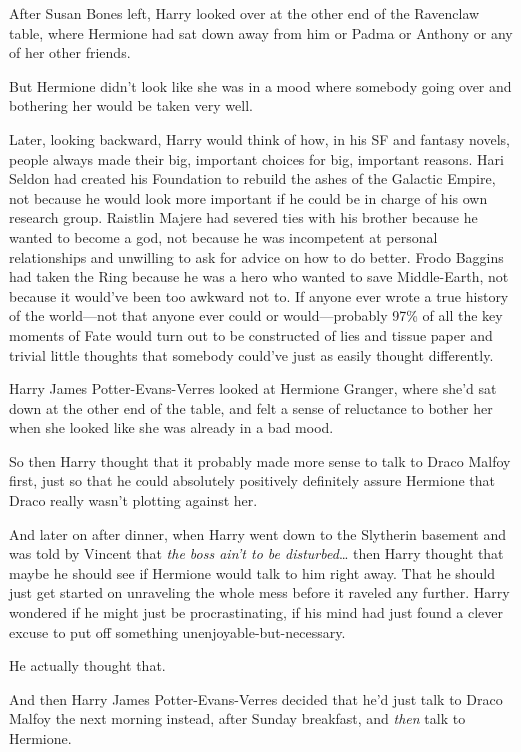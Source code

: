 After Susan Bones left, Harry looked over at the other end of the Ravenclaw
table, where Hermione had sat down away from him or Padma or Anthony or any of
her other friends.

But Hermione didn't look like she was in a mood where somebody going over and
bothering her would be taken very well.

Later, looking backward, Harry would think of how, in his SF and fantasy
novels, people always made their big, important choices for big, important
reasons. Hari Seldon had created his Foundation to rebuild the ashes of the
Galactic Empire, not because he would look more important if he could be in
charge of his own research group. Raistlin Majere had severed ties with his
brother because he wanted to become a god, not because he was incompetent at
personal relationships and unwilling to ask for advice on how to do better.
Frodo Baggins had taken the Ring because he was a hero who wanted to save
Middle-Earth, not because it would've been too awkward not to. If anyone ever
wrote a true history of the world---not that anyone ever could or
would---probably 97\% of all the key moments of Fate would turn out to be
constructed of lies and tissue paper and trivial little thoughts that somebody
could've just as easily thought differently.

Harry James Potter-Evans-Verres looked at Hermione Granger, where she'd sat
down at the other end of the table, and felt a sense of reluctance to bother
her when she looked like she was already in a bad mood.

So then Harry thought that it probably made more sense to talk to Draco Malfoy
first, just so that he could absolutely positively definitely assure Hermione
that Draco really wasn't plotting against her.

And later on after dinner, when Harry went down to the Slytherin basement and
was told by Vincent that \emph{the boss ain't to be disturbed}{\ldots} then
Harry thought that maybe he should see if Hermione would talk to him right
away. That he should just get started on unraveling the whole mess before it
raveled any further. Harry wondered if he might just be procrastinating, if his
mind had just found a clever excuse to put off something
unenjoyable-but-necessary.

He actually thought that.

And then Harry James Potter-Evans-Verres decided that he'd just talk to Draco
Malfoy the next morning instead, after Sunday breakfast, and \emph{then} talk
to Hermione.

